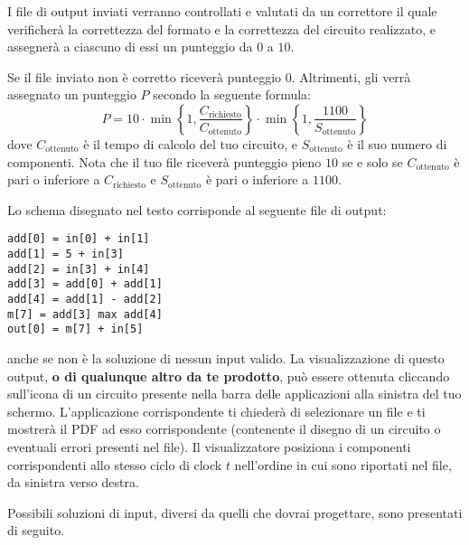 I file di output inviati verranno controllati e valutati da un correttore il quale
verificherà la correttezza del formato e la correttezza del circuito realizzato,
e assegnerà a ciascuno di essi un punteggio da $0$ a $10$.

Se il file inviato non è corretto riceverà punteggio $0$. Altrimenti, gli verrà assegnato un punteggio $P$ secondo la seguente formula:
\[
	P = 10 \cdot \min \left\{1, \frac{C_\text{richiesto}}{C_\text{ottenuto}}\right\} \cdot \min \left\{1, \frac{1100}{S_\text{ottenuto}}\right\}
\]
dove $C_\text{ottenuto}$ è il tempo di calcolo del tuo circuito, e $S_\text{ottenuto}$ è il suo numero di componenti.
Nota che il tuo file riceverà punteggio pieno $10$ se e solo se $C_\text{ottenuto}$ è pari o inferiore a $C_\text{richiesto}$ e $S_\text{ottenuto}$ è pari o inferiore a $1100$.



\Examples

Lo schema disegnato nel testo corrisponde al seguente file di output:
\begin{lstlisting}
add[0] = in[0] + in[1]
add[1] = 5 + in[3]
add[2] = in[3] + in[4]
add[3] = add[0] + add[1]
add[4] = add[1] - add[2]
m[7] = add[3] max add[4]
out[0] = m[7] + in[5]
\end{lstlisting}
anche se non è la soluzione di nessun input valido. La visualizzazione di questo output, \textbf{o di qualunque altro da te prodotto}, può essere ottenuta cliccando sull'icona di un circuito presente nella barra delle applicazioni alla sinistra del tuo schermo. L'applicazione corrispondente ti chiederà di selezionare un file e ti mostrerà il PDF ad esso corrispondente (contenente il disegno di un circuito o eventuali errori presenti nel file). Il visualizzatore posiziona i componenti corrispondenti allo stesso ciclo di clock $t$ nell'ordine in cui sono riportati nel file, da sinistra verso destra.

Possibili soluzioni di input, diversi da quelli che dovrai progettare, sono presentati di seguito.
\begin{example}
%
%
%
\end{example}



